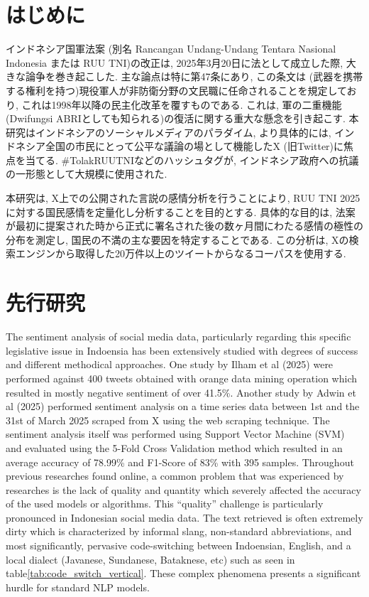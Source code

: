 \documentclass{jabstract}
\begin{document}
\maketitle

\begin{multicols}{2}
  
\section{はじめに}
インドネシア国軍法案 (別名 Rancangan Undang-Undang Tentara Nasional Indonesia または RUU TNI)の改正は, 2025年3月20日に法として成立した際, 大きな論争を巻き起こした. 主な論点は特に第47条にあり, この条文は (武器を携帯する権利を持つ)現役軍人が非防衛分野の文民職に任命されることを規定しており, これは1998年以降の民主化改革を覆すものである. これは, 軍の二重機能 (Dwifungsi ABRIとしても知られる)\cite{HRW2024}の復活に関する重大な懸念を引き起こす. 本研究はインドネシアのソーシャルメディアのパラダイム, より具体的には, インドネシア全国の市民にとって公平な議論の場として機能したX (旧Twitter)に焦点を当てる. \#TolakRUUTNIなどのハッシュタグが, インドネシア政府への抗議の一形態として大規模に使用された\cite{CNN2024}.

本研究は, X上での公開された言説の感情分析を行うことにより, RUU TNI 2025に対する国民感情を定量化し分析することを目的とする. 具体的な目的は, 法案が最初に提案された時から正式に署名された後の数ヶ月間にわたる感情の極性の分布を測定し, 国民の不満の主な要因を特定することである. この分析は, Xの検索エンジンから取得した20万件以上のツイートからなるコーパスを使用する.
\section{先行研究}
The sentiment analysis of social media data, particularly regarding this specific legislative issue in Indoensia has been extensively studied with degrees of success and different methodical approaches. One study by Ilham et al (2025) were performed against 400 tweets obtained with orange data mining operation which resulted in mostly negative sentiment of over 41.5\%\cite{Ilham2025}. Another study by Adwin et al (2025) performed sentiment analysis on a time series data between 1st and the 31st of March 2025 scraped from X using the web scraping technique. The sentiment analysis itself was performed using Support Vector Machine (SVM) and evaluated using the 5-Fold Cross Validation method which resulted in an average accuracy of 78.99\% and F1-Score of 83\%\cite{Nurhasananda_Akbar_2025} with 395 samples.
Throughout previous researches found online, a common problem that was experienced by researches is the lack of quality and quantity which severely affected the accuracy of the used models or algorithms. This ``quality'' challenge is particularly pronounced in Indonesian social media data. The text retrieved is often extremely dirty which is characterized by informal slang, non-standard abbreviations, and most significantly, pervasive code-switching between Indoensian, English, and a local dialect (Javanese, Sundanese, Bataknese, etc) such as seen in table\ref{tab:code_switch_vertical}. These complex phenomena presents a significant hurdle for standard NLP models.


\end{multicols}
\end{document}
